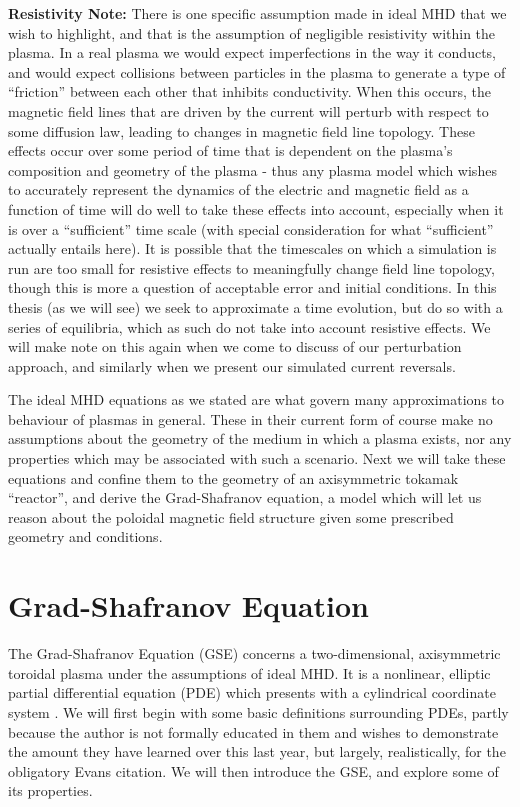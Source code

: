 \textbf{Resistivity Note:}
There is one specific assumption made in ideal MHD that we wish to highlight, and that is the assumption of negligible 
resistivity within the plasma. In a real plasma we would expect imperfections in the way it conducts, and would expect collisions 
between particles in the plasma to generate a type of ``friction'' between each other that inhibits conductivity. 
When this occurs, the magnetic field lines that are driven by the current will perturb with respect to some diffusion law, leading to 
changes in magnetic field line topology. These effects occur over some period of time that is dependent on the plasma's 
composition and geometry of the plasma - thus any plasma model which wishes to accurately represent the dynamics of the electric 
and magnetic field as a function of time will do well to take these effects into account, especially when it is over a ``sufficient'' 
time scale (with special consideration for what ``sufficient'' actually entails here). It is possible that the timescales on which 
a simulation is run are too small for resistive effects to meaningfully change field line topology, though this is more a question of 
acceptable error and initial conditions. In this thesis (as we will see) we seek to approximate a time evolution, but do so with 
a series of equilibria, which as such do not take into account resistive effects. We will make note on this again when we come to 
discuss of our perturbation approach, and similarly when we present our simulated current reversals.

The ideal MHD equations as we stated are what govern many approximations to behaviour of plasmas in general. These in their current 
form of course make no assumptions about the geometry of the medium in which a plasma exists, nor any properties which 
may be associated with such a scenario. Next we will take these equations and confine them to the geometry of an axisymmetric tokamak 
``reactor'', and derive the Grad-Shafranov equation, a model which will let us reason about the poloidal magnetic field structure given 
some prescribed geometry and conditions.

\section{Grad-Shafranov Equation}

The Grad-Shafranov Equation (GSE) concerns a two-dimensional, axisymmetric toroidal plasma under the 
assumptions of ideal MHD. It is a nonlinear, elliptic partial differential equation (PDE) which presents 
with a cylindrical coordinate system \cite{shafranov-paper}. We will first begin with some basic definitions surrounding PDEs, partly 
because the author is not formally educated in them and wishes to demonstrate the 
amount they have learned over this last year, but largely, realistically, for the obligatory Evans citation. We 
will then introduce the GSE, and explore some of its properties.

